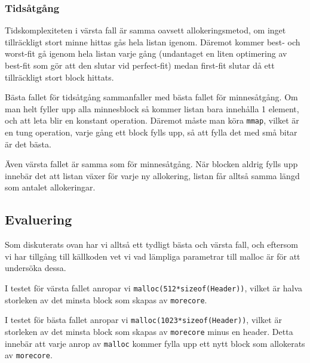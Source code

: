 \documentclass[a4paper]{article}
\begin{document}
\subsubsection*{Tidsåtgång}
Tidskomplexiteten i värsta fall är samma oavsett allokeringsmetod, om inget tillräckligt stort minne hittas gås hela listan igenom. Däremot kommer best- och worst-fit gå igenom hela listan varje gång (undantaget en liten optimering av best-fit som gör att den slutar vid perfect-fit) medan first-fit slutar då ett tillräckligt stort block hittats.

Bästa fallet för tidsåtgång sammanfaller med bästa fallet för minnesåtgång. Om man helt fyller upp alla minnesblock så kommer listan bara innehålla 1 element, och att leta blir en konstant operation. Däremot måste man köra \texttt{mmap}, vilket är en tung operation, varje gång ett block fylls upp, så att fylla det med små bitar är det bästa.

Även värsta fallet är samma som för minnesåtgång. När blocken aldrig fylls upp innebär det att listan växer för varje ny allokering, listan får alltså samma längd som antalet allokeringar.

\begin{table}[h]
\centering
\caption{Resursåtgång i värsta och bästa fall \\ m = summa av begärt minne, n = antal malloc-anrop}
\end{table}

\subsection*{Evaluering}
Som diskuterats ovan har vi alltså ett tydligt bästa och värsta fall, och eftersom vi har tillgång till källkoden vet vi vad lämpliga parametrar till malloc är för att undersöka dessa.

I testet för värsta fallet anropar vi \texttt{malloc(512*sizeof(Header))}, vilket är halva storleken av det minsta block som skapas av \texttt{morecore}.

I testet för bästa fallet anropar vi \texttt{malloc(1023*sizeof(Header))}, vilket är storleken av det minsta block som skapas av \texttt{morecore} minus en header. Detta innebär att varje anrop av \texttt{malloc} kommer fylla upp ett nytt block som allokerats av \texttt{morecore}.
\end{document}

